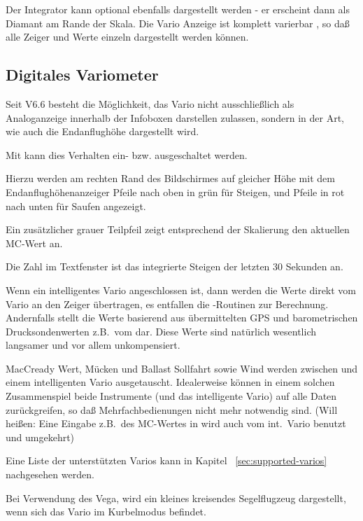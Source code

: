 Der Integrator kann optional ebenfalls dargestellt werden - er erscheint dann als Diamant am Rande der Skala.
Die Vario Anzeige ist komplett varierbar , so daß alle Zeiger und Werte einzeln dargestellt
werden können. 

\subsection*{Digitales Variometer}
Seit V6.6 besteht die Möglichkeit, das Vario nicht ausschließlich als Analoganzeige innerhalb der
Infoboxen darstellen zulassen,
sondern in der Art, wie auch die Endanflughöhe dargestellt wird.


Mit  kann dies Verhalten ein- bzw. ausgeschaltet werden.

Hierzu werden am rechten Rand des Bildschirmes auf gleicher Höhe mit dem Endanflughöhenanzeiger
Pfeile nach oben in grün für Steigen, und Pfeile in rot nach unten für Saufen angezeigt.

Ein zusätzlicher grauer Teilpfeil zeigt entsprechend der Skalierung den aktuellen MC-Wert an.

Die Zahl im  Textfenster ist das integrierte Steigen der letzten 30 Sekunden an.


Wenn ein intelligentes Vario angeschlossen ist, dann werden die Werte direkt vom Vario an den Zeiger
übertragen, es entfallen die \xc-Routinen zur Berechnung. Andernfalls stellt  \xc die Werte basierend aus
übermittelten GPS und barometrischen Drucksondenwerten z.B.\ vom \fl dar. Diese Werte sind natürlich wesentlich
langsamer und vor allem unkompensiert.

MacCready Wert, Mücken und Ballast Sollfahrt sowie Wind werden zwischen  \xc und einem
intelligenten Vario ausgetauscht. Idealerweise können in einem solchen Zusammenspiel beide Instrumente (\xc und das intelligente Vario) auf alle Daten zurückgreifen, so daß Mehrfachbedienungen nicht mehr notwendig sind.
(Will heißen: Eine Eingabe z.B.\ des MC-Wertes in  \xc wird auch vom int.\ Vario benutzt und umgekehrt)

Eine Liste der unterstützten Varios kann in Kapitel  ~\ref{sec:supported-varios} nachgesehen werden.

Bei Verwendung des \textsf{Vega}, wird ein kleines kreisendes Segelflugzeug dargestellt, wenn sich das Vario
im Kurbelmodus befindet.
